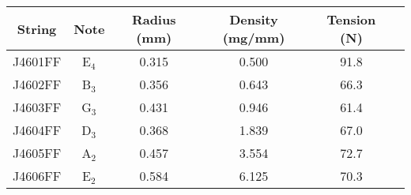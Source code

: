 \begin{tabular}{cccccc}
\toprule
String & Note & Radius (mm) & Density (mg/mm) & Tension (N) \\
\midrule
J4601FF & E$_{4}$ & 0.315 & 0.500 & 91.8 \\
J4602FF & B$_{3}$ & 0.356 & 0.643 & 66.3 \\
J4603FF & G$_{3}$ & 0.431 & 0.946 & 61.4 \\
J4604FF & D$_{3}$ & 0.368 & 1.839 & 67.0 \\
J4605FF & A$_{2}$ & 0.457 & 3.554 & 72.7 \\
J4606FF & E$_{2}$ & 0.584 & 6.125 & 70.3 \\
\bottomrule
\end{tabular}

